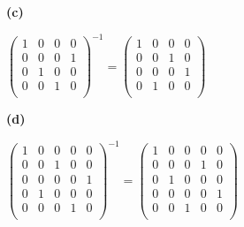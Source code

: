 \documentclass[oneside,12pt]{amsart}
\begin{document}
\bigskip

\textbf{(c)}

$
\begin{pmatrix}
1 & 0 & 0 & 0 \\
0 & 0 & 0 & 1 \\
0 & 1 & 0 & 0 \\
0 & 0 & 1 & 0 \\
\end{pmatrix}^{-1}=
\begin{pmatrix}
1 & 0 & 0 & 0 \\
0 & 0 & 1 & 0 \\
0 & 0 & 0 & 1 \\
0 & 1 & 0 & 0 \\
\end{pmatrix}
$

\bigskip

\textbf{(d)}

$
\begin{pmatrix}
1 & 0 & 0 & 0 & 0 \\
0 & 0 & 1 & 0 & 0 \\
0 & 0 & 0 & 0 & 1 \\
0 & 1 & 0 & 0 & 0 \\
0 & 0 & 0 & 1 & 0 \\
\end{pmatrix}^{-1}=
\begin{pmatrix}
1 & 0 & 0 & 0 & 0 \\
0 & 0 & 0 & 1 & 0 \\
0 & 1 & 0 & 0 & 0 \\
0 & 0 & 0 & 0 & 1 \\
0 & 0 & 1 & 0 & 0 \\
\end{pmatrix}
$
\end{document}
